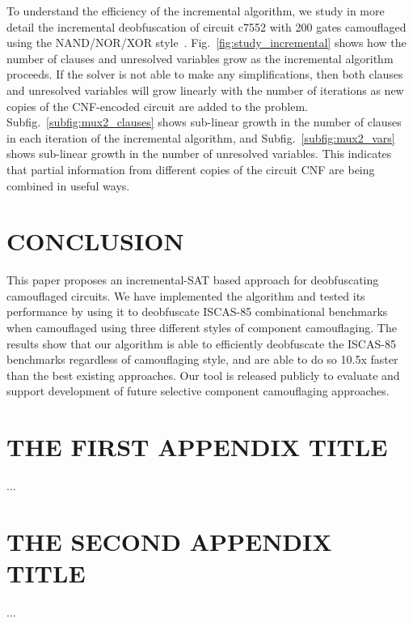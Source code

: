 \documentclass[proposal]{umassthesis}  %
\begin{document}



To understand the efficiency of the incremental algorithm, we study in more detail the incremental deobfuscation of circuit c7552 with 200 gates camouflaged using the NAND/NOR/XOR style~\cite{rajendran-13}. Fig.~\ref{fig:study_incremental} shows how the number of clauses and unresolved variables grow as the incremental algorithm proceeds. If the solver is not able to make any simplifications, then both clauses and unresolved variables will grow linearly with the number of iterations as new copies of the CNF-encoded circuit are added to the problem. Subfig.~\ref{subfig:mux2_clauses} shows sub-linear growth in the number of clauses in each iteration of the incremental algorithm, and Subfig.~\ref{subfig:mux2_vars} shows sub-linear growth in the number of unresolved variables. This indicates that partial information from different copies of the circuit CNF are being combined in useful ways. 


\chapter{CONCLUSION}

This paper proposes an incremental-SAT based approach for deobfuscating camouflaged circuits. We have implemented the algorithm and tested its performance by using it to deobfuscate ISCAS-85 combinational benchmarks when camouflaged using three different styles of component camouflaging. The results show that our algorithm is able to efficiently deobfuscate the ISCAS-85 benchmarks regardless of camouflaging style, and are able to do so 10.5x faster than the best existing approaches. Our tool is released publicly to evaluate and support development of future selective component camouflaging approaches. 


\appendix
\chapter{THE FIRST APPENDIX TITLE}
...
\chapter{THE SECOND APPENDIX TITLE}
...

\backmatter  %




\end{document}
